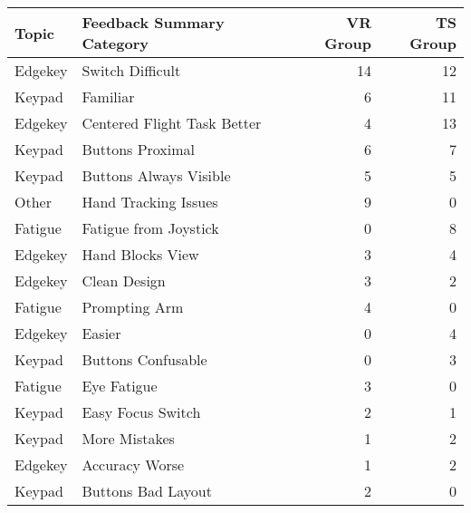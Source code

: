 \begin{tabular}{@{}llrr@{}}
\toprule
   Topic &    Feedback Summary Category &  VR Group &  TS Group \\
\midrule
 Edgekey &             Switch Difficult &        14 &        12 \\
  Keypad &                     Familiar &         6 &        11 \\
 Edgekey &  Centered Flight Task Better &         4 &        13 \\
  Keypad &             Buttons Proximal &         6 &         7 \\
  Keypad &       Buttons Always Visible &         5 &         5 \\
   Other &         Hand Tracking Issues &         9 &         0 \\
 Fatigue &        Fatigue from Joystick &         0 &         8 \\
 Edgekey &             Hand Blocks View &         3 &         4 \\
 Edgekey &                 Clean Design &         3 &         2 \\
 Fatigue &                Prompting Arm &         4 &         0 \\
 Edgekey &                       Easier &         0 &         4 \\
  Keypad &           Buttons Confusable &         0 &         3 \\
 Fatigue &                  Eye Fatigue &         3 &         0 \\
  Keypad &            Easy Focus Switch &         2 &         1 \\
  Keypad &                More Mistakes &         1 &         2 \\
 Edgekey &               Accuracy Worse &         1 &         2 \\
  Keypad &           Buttons Bad Layout &         2 &         0 \\
\bottomrule
\end{tabular}
